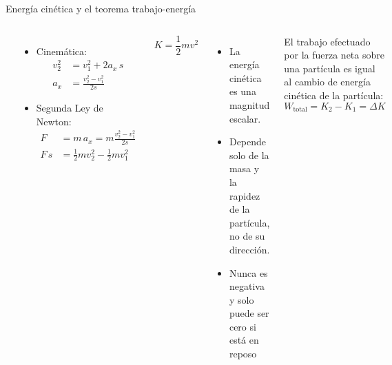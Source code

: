\documentclass[9pt, aspectratio=169]{beamer}
\begin{document}
\begin{frame}{Energía cinética y el teorema trabajo-energía}
\begin{columns}
\cx
\begin{center}
    \includegraphics[width=0.7\textwidth]{figs/fig-04.png}
\end{center}
\begin{itemize}
    \item Cinemática:
        \begin{align*}
            v_2^2 &= v_1^2 + 2 a_x \, s \\
            a_x &= \frac{v_2^2 - v_1^2}{2 s}
        \end{align*}
    \item Segunda Ley de Newton:
        \begin{align*}
        F &= m \, a_x = m \frac{v_2^2 - v_1^2}{2s} \\
        F \, s &= \frac{1}{2} m v_2^2 - \frac{1}{2} m v_1^2 
        \end{align*}
    \end{itemize}
\pause
\cx
\begin{definition}
    \[ K = \frac{1}{2} m v^2 \]
\end{definition}
    \begin{itemize}
        \item La energía cinética es una magnitud \alert{escalar}.
        \item Depende solo de la masa y la rapidez de la partícula, no de su dirección.
        \item Nunca es negativa y solo puede ser cero si está en reposo
    \end{itemize}
\pause 

\begin{theorem}
El trabajo efectuado por la fuerza neta sobre una partícula es igual al cambio de energía cinética de la partícula:
\[ W_{\text{total}} = K_2 - K_1 = \Delta K \]
\end{theorem}
\end{columns}
\end{frame}
\end{document}
